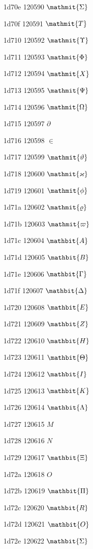 \documentclass[11pt]{article}
\begin{document}
1d70e 120590 \ensuremath{\mathmit{\Sigma}}

1d70f 120591 \ensuremath{\mathmit{{T}}}

1d710 120592 \ensuremath{\mathmit{\Upsilon}}

1d711 120593 \ensuremath{\mathmit{\Phi}}

1d712 120594 \ensuremath{\mathmit{{X}}}

1d713 120595 \ensuremath{\mathmit{\Psi}}

1d714 120596 \ensuremath{\mathmit{\Omega}}

1d715 120597 \ensuremath{\partial}

1d716 120598 \ensuremath{\in}

1d717 120599 \ensuremath{\mathmit{\vartheta}}

1d718 120600 \ensuremath{\mathmit{\varkappa}}

1d719 120601 \ensuremath{\mathmit{\phi}}

1d71a 120602 \ensuremath{\mathmit{\varrho}}

1d71b 120603 \ensuremath{\mathmit{\varpi}}

1d71c 120604 \ensuremath{\mathbit{{A}}}

1d71d 120605 \ensuremath{\mathbit{{B}}}

1d71e 120606 \ensuremath{\mathbit{\Gamma}}

1d71f 120607 \ensuremath{\mathbit{\Delta}}

1d720 120608 \ensuremath{\mathbit{{E}}}

1d721 120609 \ensuremath{\mathbit{{Z}}}

1d722 120610 \ensuremath{\mathbit{{H}}}

1d723 120611 \ensuremath{\mathbit{\Theta}}

1d724 120612 \ensuremath{\mathbit{{I}}}

1d725 120613 \ensuremath{\mathbit{{K}}}

1d726 120614 \ensuremath{\mathbit{\Lambda}}

1d727 120615 \ensuremath{M}

1d728 120616 \ensuremath{N}

1d729 120617 \ensuremath{\mathbit{\Xi}}

1d72a 120618 \ensuremath{O}

1d72b 120619 \ensuremath{\mathbit{\Pi}}

1d72c 120620 \ensuremath{\mathbit{{R}}}

1d72d 120621 \ensuremath{\mathbit{O}}

1d72e 120622 \ensuremath{\mathbit{\Sigma}}
\end{document}
